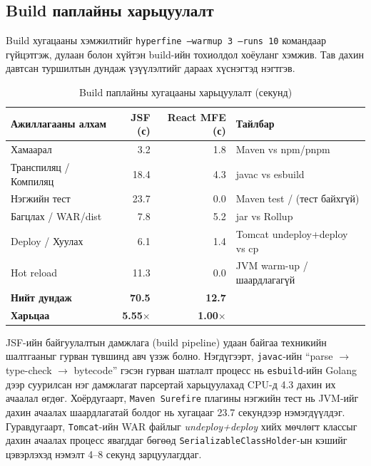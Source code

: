 \subsection{Build паплайны харьцуулалт}

Build хугацааны хэмжилтийг \texttt{hyperfine --warmup 3 --runs 10}
командаар гүйцэтгэж, дулаан болон хүйтэн build-ийн тохиолдол хоёуланг
хэмжив. Тав дахин давтсан туршилтын дундаж үзүүлэлтийг дараах хүснэгтэд
нэгтгэв.

\begin{table}[H]
    \centering
    \caption{Build паплайны хугацааны харьцуулалт (секунд)}
    \label{tab:build_times}
    \renewcommand{\arraystretch}{0.7}
    \begin{tabular}{lrrl}
        \toprule
        \textbf{Ажиллагааны алхам} & \textbf{JSF (с)} & \textbf{React MFE (с)} & \textbf{Тайлбар} \\
        \midrule
        Хамаарал   & 3.2  & 1.8  & Maven vs npm/pnpm \\
        Транспиляц / Компиляц    & 18.4 & 4.3  & javac vs esbuild \\
        Нэгжийн тест                & 23.7 & 0.0  & Maven test / (тест байхгүй) \\
        Багцлах / WAR/dist       & 7.8  & 5.2  & jar vs Rollup \\
        Deploy / Хуулах          & 6.1  & 1.4  & Tomcat undeploy+deploy vs cp \\
        Hot reload    & 11.3 & 0.0  & JVM warm-up / шаардлагагүй \\
        \midrule
        \textbf{Нийт дундаж}     & \textbf{70.5} & \textbf{12.7} & \\
        \textbf{Харьцаа}         & \textbf{5.55$\times$} & \textbf{1.00$\times$} & \\
        \bottomrule
    \end{tabular}
\end{table}


JSF-ийн байгуулалтын дамжлага (build pipeline) удаан байгаа техникийн шалтгааныг гурван түвшинд авч үзэж болно. Нэгдүгээрт, \texttt{javac}-ийн ``parse $\rightarrow$ type-check $\rightarrow$ bytecode'' гэсэн гурван шатлалт процесс нь \texttt{esbuild}-ийн Golang дээр суурилсан нэг дамжлагат парсертай харьцуулахад CPU-д 4.3 дахин их ачаалал өгдөг. Хоёрдугаарт, \texttt{Maven Surefire} плагины нэгжийн тест нь JVM-ийг дахин ачаалах шаардлагатай болдог нь хугацааг 23.7 секундээр нэмэгдүүлдэг. Гуравдугаарт, \texttt{Tomcat}-ийн WAR файлыг \textit{undeploy+deploy} хийх мөчлөгт классыг дахин ачаалах процесс явагддаг бөгөөд \texttt{SerializableClassHolder}-ын кэшийг цэвэрлэхэд нэмэлт 4--8 секунд зарцуулагддаг.


